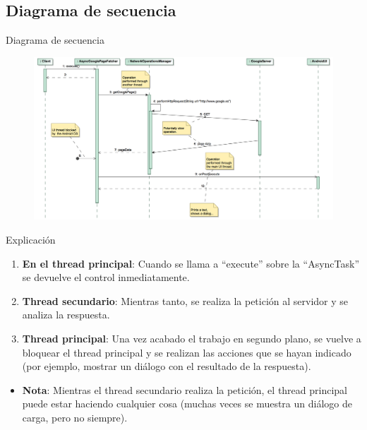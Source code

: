 \documentclass{beamer}
\begin{document}
\subsection{Diagrama de secuencia}
\begin{frame}{Diagrama de secuencia}
\begin{figure}
\begin{center}
\includegraphics[scale=0.4]{../naive/design_models/get_google_data_sequence}
\end{center}
\end{figure}
\end{frame}

\begin{frame}{Explicación}
\begin{enumerate}
\item {\bf En el thread principal}: Cuando se llama a ``execute'' sobre la ``AsyncTask'' se devuelve el control inmediatamente.
\item {\bf Thread secundario}: Mientras tanto, se realiza la petición al servidor y se analiza la respuesta. 
\item {\bf Thread principal}: Una vez acabado el trabajo en segundo plano, se vuelve a bloquear el thread principal y se realizan las acciones que se hayan indicado (por ejemplo, mostrar un diálogo con el resultado de la respuesta).
\end{enumerate}
\begin{itemize}
\item {\bf Nota}: Mientras el thread secundario realiza la petición, el thread principal puede estar haciendo cualquier cosa (muchas veces se muestra un diálogo de carga, pero no siempre).
\end{itemize}
\end{frame}
\end{document}
